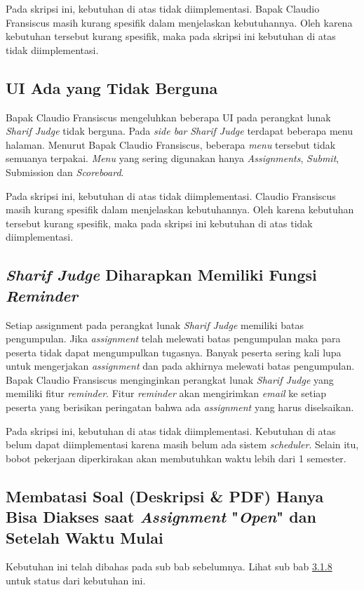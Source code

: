 Pada skripsi ini, kebutuhan di atas tidak diimplementasi. Bapak Claudio Fransiscus masih kurang spesifik dalam menjelaskan kebutuhannya. Oleh karena kebutuhan tersebut kurang spesifik, maka pada skripsi ini kebutuhan di atas tidak diimplementasi.

\subsection{UI Ada yang Tidak Berguna}
Bapak Claudio Fransiscus mengeluhkan beberapa UI pada perangkat lunak \textit{Sharif Judge} tidak berguna. Pada \textit{side bar} \textit{Sharif Judge} terdapat beberapa menu halaman. Menurut Bapak Claudio Fransiscus, beberapa \textit{menu} tersebut tidak semuanya terpakai. \textit{Menu} yang sering digunakan hanya \textit{Assignments}, \textit{Submit}, Submission dan \textit{Scoreboard}.

Pada skripsi ini, kebutuhan di atas tidak diimplementasi. Claudio Fransiscus masih kurang spesifik dalam menjelaskan kebutuhannya. Oleh karena kebutuhan tersebut kurang spesifik, maka pada skripsi ini kebutuhan di atas tidak diimplementasi.

\subsection{\textit{Sharif Judge} Diharapkan Memiliki Fungsi \textit{Reminder}}
Setiap assignment pada perangkat lunak \textit{Sharif Judge} memiliki batas pengumpulan. Jika \textit{assignment} telah melewati batas pengumpulan maka para peserta tidak dapat mengumpulkan tugasnya. Banyak peserta sering kali lupa untuk mengerjakan \textit{assignment} dan pada akhirnya melewati batas pengumpulan. Bapak Claudio Fransiscus menginginkan perangkat lunak \textit{Sharif Judge} yang memiliki fitur \textit{reminder}. Fitur \textit{reminder} akan mengirimkan \textit{email} ke setiap peserta yang berisikan peringatan bahwa ada \textit{assignment} yang harus diselsaikan. 

Pada skripsi ini, kebutuhan di atas tidak diimplementasi. Kebutuhan di atas belum dapat diimplementasi karena masih belum ada sistem \textit{scheduler}. Selain itu, bobot pekerjaan diperkirakan akan membutuhkan waktu lebih dari 1 semester.

\subsection{Membatasi Soal (Deskripsi \& PDF) Hanya Bisa Diakses saat \textit{Assignment} "\textit{Open}" dan Setelah Waktu Mulai}
Kebutuhan ini telah dibahas pada sub bab sebelumnya. Lihat sub bab \hyperref[subsec:membatasisoal]{3.1.8} untuk status dari kebutuhan ini.

